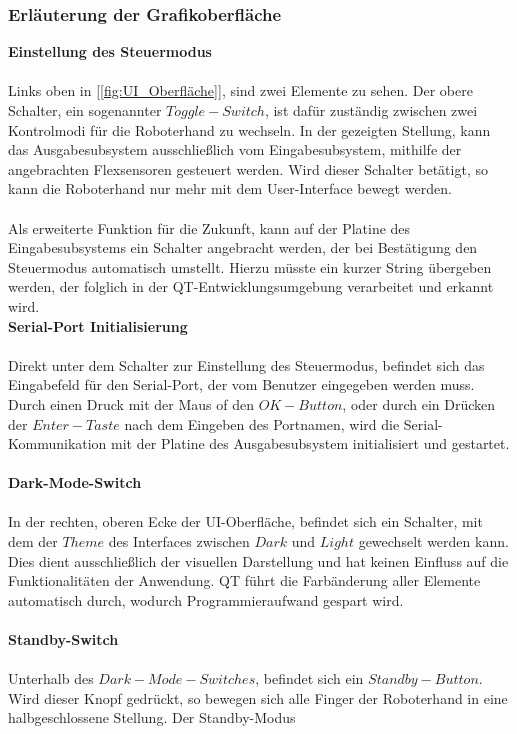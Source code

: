 \documentclass[titlepage,12pt,twoside]{article}
\begin{document}
\subsubsection{Erläuterung der Grafikoberfläche}
\textbf{Einstellung des Steuermodus} \\
\\
Links oben in [\textcolor{blue}{\autoref{fig:UI_Oberfläche}}], sind zwei Elemente zu sehen. Der obere Schalter, ein sogenannter $Toggle-Switch$, ist dafür zuständig
zwischen zwei Kontrolmodi für die Roboterhand zu wechseln. In der gezeigten Stellung, kann das Ausgabesubsystem ausschließlich vom Eingabesubsystem,
mithilfe der angebrachten Flexsensoren gesteuert werden. Wird dieser Schalter betätigt, so kann die Roboterhand nur mehr mit dem User-Interface
bewegt werden. \\
\\
Als erweiterte Funktion für die Zukunft, kann auf der Platine des Eingabesubsystems ein Schalter angebracht werden, der bei Bestätigung
den Steuermodus automatisch umstellt. Hierzu müsste ein kurzer String übergeben werden, der folglich in der QT-Entwicklungsumgebung verarbeitet
und erkannt wird. \\
\textbf{Serial-Port Initialisierung} \\
\\
Direkt unter dem Schalter zur Einstellung des Steuermodus, befindet sich das Eingabefeld für den Serial-Port, der vom Benutzer eingegeben werden muss. Durch 
einen Druck mit der Maus of den $OK-Button$, oder durch ein Drücken der $Enter-Taste$ nach dem Eingeben des Portnamen, wird die Serial-Kommunikation mit der Platine des Ausgabesubsystem 
initialisiert und gestartet. \\
\\
\textbf{Dark-Mode-Switch} \\
\\
In der rechten, oberen Ecke der UI-Oberfläche, befindet sich ein Schalter, mit dem der $Theme$ des Interfaces zwischen $Dark$ und $Light$ gewechselt werden kann. Dies dient ausschließlich der 
visuellen Darstellung und hat keinen Einfluss auf die Funktionalitäten der Anwendung. QT führt die Farbänderung aller Elemente automatisch durch, wodurch Programmieraufwand gespart wird. \\
\\
\textbf{Standby-Switch} \\
\\
Unterhalb des $Dark-Mode-Switches$, befindet sich ein $Standby-Button$. Wird dieser Knopf gedrückt, so bewegen sich alle Finger der Roboterhand in eine halbgeschlossene Stellung. Der Standby-Modus
\end{document}
